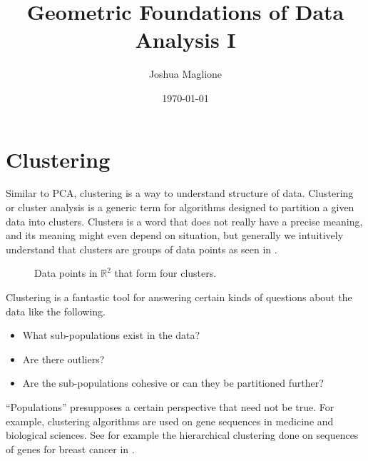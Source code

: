 \documentclass[a4paper, 12pt]{article}
\title{Geometric Foundations of Data Analysis I}
\author{Joshua Maglione}
\date{\today}
\numberwithin{equation}{section}
\numberwithin{figure}{section}
\theoremstyle{definition}
\newcommand{\R}{\mathbb{R}}
\begin{document}
\maketitle
\tableofcontents

\setcounter{section}{3}
\setcounter{algorithm}{1}


\section{Clustering}

Similar to PCA, clustering is a way to understand structure of data. Clustering
or cluster analysis is a generic term for algorithms designed to partition a
given data into clusters. Clusters is a word that does not really have a precise
meaning, and its meaning might even depend on situation, but generally we
intuitively understand that clusters are groups of data points as seen in
.

\begin{figure}
	\centering 
	\caption{Data points in $\R^2$ that form four clusters.}
	\label{fig:clusters}
\end{figure}

Clustering is a fantastic tool for answering certain kinds of questions about
the data like the following.
\begin{itemize}
	\item What sub-populations exist in the data? 
	\item Are there outliers? 
	\item Are the sub-populations cohesive or can they be partitioned further? 
\end{itemize}
``Populations'' presupposes a certain perspective that need not be true. For
example, clustering algorithms are used on gene sequences in medicine and
biological sciences. See for example the hierarchical clustering done on
sequences of genes for breast cancer in .
\end{document}
